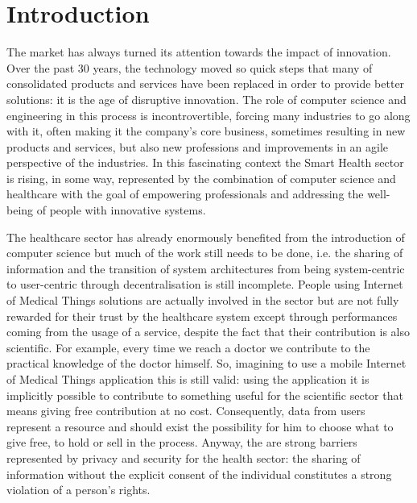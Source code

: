 \documentclass[preprint]{elsarticle}
\begin{document}
\date{\today}
\maketitle

\section{Introduction}
The market has always turned its attention towards the impact of innovation. Over the past 30 years, the technology moved so quick steps that many of consolidated products and services have been replaced in order to provide better solutions: it is the age of disruptive innovation.
The role of computer science and engineering in this process is incontrovertible, forcing many industries to go along with it, often making it the company's core business, sometimes resulting in new products and services, but also new professions and improvements in an agile perspective of the industries.
In this fascinating context the Smart Health sector is rising, in some way, represented by the combination of computer science and healthcare with the goal of empowering professionals and addressing the well-being of people with innovative systems.

The healthcare sector has already enormously benefited from the introduction of computer science but much of the work still needs to be done, i.e. the sharing of information and the transition of system architectures from being system-centric to user-centric through decentralisation is still incomplete.
People using Internet of Medical Things solutions are actually involved in the sector but are not fully rewarded for their trust by the healthcare system except through performances coming from the usage of a service, despite the fact that their contribution is also scientific.
For example, every time we reach a doctor we contribute to the practical knowledge of the doctor himself. So, imagining to use a mobile Internet of Medical Things application this is still valid: using the application it is implicitly possible to contribute to something useful for the scientific sector that means giving free contribution at no cost.
Consequently, data from users represent a resource and should exist the possibility for him to choose what to give free, to hold or sell in the process.
Anyway, the are strong barriers represented by privacy and security for the health sector: the sharing of information without the explicit consent of the individual constitutes a strong violation of a person's rights.
\end{document}
